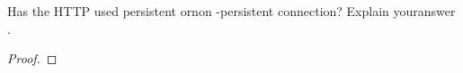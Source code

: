 \documentclass[../../main.tex]{subfiles}
\begin{document}
\begin{wts}
Has the HTTP used persistent ornon -persistent connection? Explain youranswer .  
\end{wts}
\begin{proof}

\end{proof}
\end{document}
